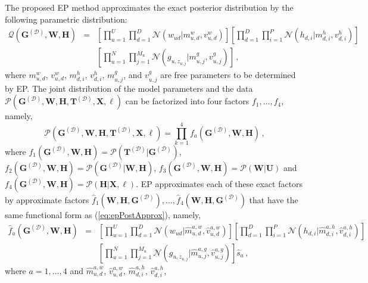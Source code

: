 \documentclass{article}
\begin{document}
The proposed EP method approximates the exact posterior distribution by the following parametric distribution:
\begin{eqnarray}
\mathcal{Q}(\mathbf{G}^{(\mathcal{D})},\mathbf{W},\mathbf{H}) & = & \left[\prod_{u=1}^{U}\prod_{d=1}^{D}\mathcal{N}(w_{ud}|m_{u,d}^{w},v_{u,d}^{w})\right]
\left[\prod_{d=1}^{D}\prod_{i=1}^{P} \mathcal{N}(h_{d,i}|m_{d,i}^h,v_{d,i}^{h})\right]\nonumber\\
& & \left[\prod_{u=1}^N \prod_{j=1}^{M_u} \mathcal{N}(g_{u,z_{u,j}}|m_{u,j}^g,v_{u,j}^g)\right]\,,\label{eq:epPostApprox}
\end{eqnarray}
where $m_{u,d}^w$, $v_{u,d}^w$, $m_{d,i}^h$, $v_{d,i}^h$,
$m_{u,j}^g$, and $v_{u,j}^g$ are free parameters to be determined by EP. 
The joint distribution of the model parameters and the data 
$\mathcal{P}(\mathbf{G}^{(\mathcal{D})},\mathbf{W},\mathbf{H},\mathbf{T}^{(\mathcal{D})},\mathbf{X},\ell)$ can be factorized
into four factors $f_1,\ldots,f_4$, namely,
\begin{equation}
\mathcal{P}(\mathbf{G}^{(\mathcal{D})},\mathbf{W},\mathbf{H},\mathbf{T}^{(\mathcal{D})},\mathbf{X},\ell) =
\prod_{k=1}^4 f_a(\mathbf{G}^{(\mathcal{D})},\mathbf{W},\mathbf{H})\,,
\end{equation}
where $f_1(\mathbf{G}^{(\mathcal{D})},\mathbf{W},\mathbf{H}) = \mathcal{P}(\mathbf{T}^{(\mathcal{D})}|\mathbf{G}^{(\mathcal{D})})$,
$f_2(\mathbf{G}^{(\mathcal{D})},\mathbf{W},\mathbf{H}) = \mathcal{P}(\mathbf{G}^{(\mathcal{D})}|\mathbf{W},\mathbf{H})$,
$f_3(\mathbf{G}^{(\mathcal{D})},\mathbf{W},\mathbf{H}) = \mathcal{P}(\mathbf{W}|\mathbf{U})$ and
$f_4(\mathbf{G}^{(\mathcal{D})},\mathbf{W},\mathbf{H}) = \mathcal{P}(\mathbf{H}|\mathbf{X},\ell)$.
EP approximates each of these exact factors by 
approximate factors $\hat{f}_{1}(\mathbf{W},\mathbf{H},\mathbf{G}^{(\mathcal{D})}),\ldots,\hat{f}_{4}(\mathbf{W},\mathbf{H},\mathbf{G}^{(\mathcal{D})})$
that have the same functional form as (\ref{eq:epPostApprox}), namely,
\begin{eqnarray}
\hat{f}_a(\mathbf{G}^{(\mathcal{D})},\mathbf{W},\mathbf{H}) & = &
\left[\prod_{u=1}^{U}\prod_{d=1}^{D}\mathcal{N}(w_{ud}|\hat{m}_{u,d}^{a,w},\hat{v}_{u,d}^{a,w})\right]
\left[\prod_{d=1}^{D}\prod_{i=1}^{P} \mathcal{N}(h_{d,i}|\hat{m}_{d,i}^{a,h},\hat{v}_{d,i}^{a,h})\right]\nonumber\\
& & \left[\prod_{u=1}^N \prod_{j=1}^{M_u} \mathcal{N}(g_{u,z_{u,j}}|\hat{m}_{u,j}^{a,g},\hat{v}_{u,j}^{a,g})\right] \hat{s}_a\,,
\end{eqnarray}
where $a=1,\ldots,4$ and $\hat{m}_{u,d}^{a,w}$, $\hat{v}_{u,d}^{a,w}$, $\hat{m}_{d,i}^{a,h}$, $\hat{v}_{d,i}^{a,h}$,
\end{document}
